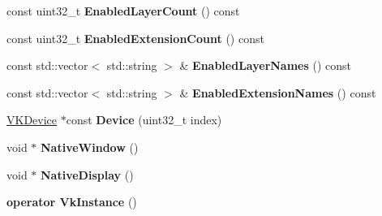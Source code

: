 \begin{DoxyCompactItemize}
\item 
const uint32\+\_\+t {\bfseries Enabled\+Layer\+Count} () const \hypertarget{classHatchit_1_1Graphics_1_1Vulkan_1_1VKApplication_ad6dd55c76d3e2fa294600333798d366c}{}\label{classHatchit_1_1Graphics_1_1Vulkan_1_1VKApplication_ad6dd55c76d3e2fa294600333798d366c}

\item 
const uint32\+\_\+t {\bfseries Enabled\+Extension\+Count} () const \hypertarget{classHatchit_1_1Graphics_1_1Vulkan_1_1VKApplication_ab1e830afa38c3ce6d92f1f7cf7315b8e}{}\label{classHatchit_1_1Graphics_1_1Vulkan_1_1VKApplication_ab1e830afa38c3ce6d92f1f7cf7315b8e}

\item 
const std\+::vector$<$ std\+::string $>$ \& {\bfseries Enabled\+Layer\+Names} () const \hypertarget{classHatchit_1_1Graphics_1_1Vulkan_1_1VKApplication_a4fa3b3dde3f2ffce4f467c0e101edc21}{}\label{classHatchit_1_1Graphics_1_1Vulkan_1_1VKApplication_a4fa3b3dde3f2ffce4f467c0e101edc21}

\item 
const std\+::vector$<$ std\+::string $>$ \& {\bfseries Enabled\+Extension\+Names} () const \hypertarget{classHatchit_1_1Graphics_1_1Vulkan_1_1VKApplication_a8430bf85d87a7a0f49ac558aa37b2a86}{}\label{classHatchit_1_1Graphics_1_1Vulkan_1_1VKApplication_a8430bf85d87a7a0f49ac558aa37b2a86}

\item 
\hyperlink{classHatchit_1_1Graphics_1_1Vulkan_1_1VKDevice}{V\+K\+Device} $\ast$const {\bfseries Device} (uint32\+\_\+t index)\hypertarget{classHatchit_1_1Graphics_1_1Vulkan_1_1VKApplication_a5d7c28eee36e909ebeaf42165620abfd}{}\label{classHatchit_1_1Graphics_1_1Vulkan_1_1VKApplication_a5d7c28eee36e909ebeaf42165620abfd}

\item 
void $\ast$ {\bfseries Native\+Window} ()\hypertarget{classHatchit_1_1Graphics_1_1Vulkan_1_1VKApplication_a79e3a20217059dfcb792609324c1e41f}{}\label{classHatchit_1_1Graphics_1_1Vulkan_1_1VKApplication_a79e3a20217059dfcb792609324c1e41f}

\item 
void $\ast$ {\bfseries Native\+Display} ()\hypertarget{classHatchit_1_1Graphics_1_1Vulkan_1_1VKApplication_aa479c6f6a46aa0f278672f5a064afaca}{}\label{classHatchit_1_1Graphics_1_1Vulkan_1_1VKApplication_aa479c6f6a46aa0f278672f5a064afaca}

\item 
{\bfseries operator Vk\+Instance} ()\hypertarget{classHatchit_1_1Graphics_1_1Vulkan_1_1VKApplication_af515da6a4b9dd6f2831d98609220e52f}{}\label{classHatchit_1_1Graphics_1_1Vulkan_1_1VKApplication_af515da6a4b9dd6f2831d98609220e52f}

\end{DoxyCompactItemize}



